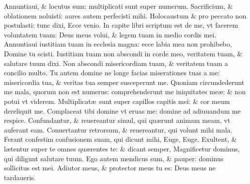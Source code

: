 \documentclass[a5paper,10pt]{book}
\def\ae{æ}
\begin{document}
\begin{multicols*}{2}
\newline \color{red} A\color{black}nnuntiaui, \& locutus sum: multiplicati sunt super numerum.
\newline \color{red} S\color{black}acrificium, \& oblationem noluisti: aures autem perfecisti mihi.
\newline \color{red} H\color{black}olocaustum \& pro peccato non postulasti: tunc dixi, Ecce venio.
\newline \color{red} I\color{black}n capite libri scriptum est de me, vt facerem voluntatem tuam: Deus meus volui, \& legem tuam in medio cordis mei.
\newline \color{red} A\color{black}nnuntiaui iustitiam tuam in ecclesia magna: ecce labia mea non prohibebo, Domine tu scisti.
\newline \color{red} I\color{black}ustitiam tuam non abscondi in corde meo, veritatem tuam, \& salutare tuum dixi.
\newline \color{red} N\color{black}on abscondi misericordiam tuam, \& veritatem tuam a concilio multo.
\newline \color{red} T\color{black}u autem domine ne longe facias miserationes tuas a me: misericordia tua, \& veritas tua semper susceperunt me.
\newline \color{red} Q\color{black}uoniam circundederunt me mala, quorum non est numerus: comprehenderunt me iniquitates me\ae : \& non potui vt viderem.
\newline \color{red} M\color{black}ultiplicat\ae \ sunt super capillos capitis mei: \& cor meum dereliquit me.
\newline \color{red} C\color{black}omplaceat tibi domine vt eruas me: domine ad adiuuandum me respice.
\newline \color{red} C\color{black}onfundantur, \& reuereantur simul, qui qu\ae runt animam meam, vt auferant eam.
\newline \color{red} C\color{black}onuertantur retrorsum, \& reuereantur, qui volunt mihi mala.
\newline \color{red} F\color{black}erant confestim confusionem suam, qui dicunt mihi, Euge, Euge.
\newline \color{red} E\color{black}xultent, \& l\ae tentur super te omnes qu\ae rentes te: \& dicant semper, Magnificetur dominus, qui diligunt salutare tuum.
\newline \color{red} E\color{black}go autem mendicus sum, \& pauper: dominus sollicitus est mei.
\newline \color{red} A\color{black}diutor meus, \& protector meus tu es: Deus meus ne tardaueris.

\end{multicols*}
\end{document}
